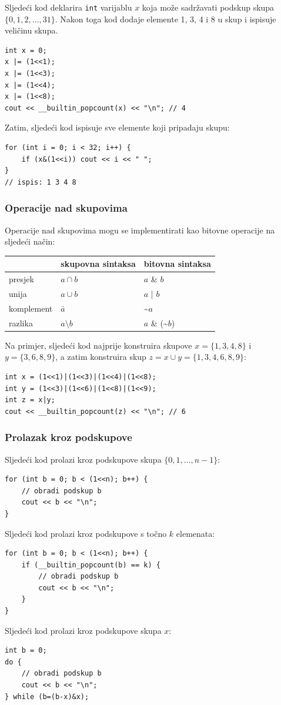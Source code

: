 Sljedeći kod deklarira \texttt{int}
varijablu $x$ koja može sadržavati
podskup skupa $\{0,1,2,\ldots,31\}$.
Nakon toga kod dodaje elemente 1, 3, 4 i 8
u skup i ispisuje veličinu skupa.
\begin{lstlisting}
int x = 0;
x |= (1<<1);
x |= (1<<3);
x |= (1<<4);
x |= (1<<8);
cout << __builtin_popcount(x) << "\n"; // 4
\end{lstlisting}
Zatim, sljedeći kod ispisuje sve
elemente koji pripadaju skupu:
\begin{lstlisting}
for (int i = 0; i < 32; i++) {
    if (x&(1<<i)) cout << i << " ";
}
// ispis: 1 3 4 8
\end{lstlisting}

\subsubsection{Operacije nad skupovima}

Operacije nad skupovima mogu se implementirati kao bitovne operacije na sljedeći način:

\begin{center}
\begin{tabular}{lll}
& skupovna sintaksa & bitovna sintaksa \\
\hline
presjek & $a \cap b$ & $a$ \& $b$ \\
unija & $a \cup b$ & $a$ | $b$ \\
komplement & $\bar a$ & \textasciitilde$a$ \\
razlika & $a \setminus b$ & $a$ \& (\textasciitilde$b$) \\
\end{tabular}
\end{center}

Na primjer, sljedeći kod najprije konstruira
skupove $x=\{1,3,4,8\}$ i $y=\{3,6,8,9\}$,
a zatim konstruira skup $z = x \cup y = \{1,3,4,6,8,9\}$:

\begin{lstlisting}
int x = (1<<1)|(1<<3)|(1<<4)|(1<<8);
int y = (1<<3)|(1<<6)|(1<<8)|(1<<9);
int z = x|y;
cout << __builtin_popcount(z) << "\n"; // 6
\end{lstlisting}

\subsubsection{Prolazak kroz podskupove}

Sljedeći kod prolazi kroz
podskupove skupa $\{0,1,\ldots,n-1\}$:

\begin{lstlisting}
for (int b = 0; b < (1<<n); b++) {
    // obradi podskup b
    cout << b << "\n";
}
\end{lstlisting}
Sljedeći kod prolazi kroz
podskupove s točno $k$ elemenata:
\begin{lstlisting}
for (int b = 0; b < (1<<n); b++) {
    if (__builtin_popcount(b) == k) {
        // obradi podskup b
        cout << b << "\n";
    }
}
\end{lstlisting}
Sljedeći kod prolazi kroz podskupove
skupa $x$:
\begin{lstlisting}
int b = 0;
do {
    // obradi podskup b
    cout << b << "\n";
} while (b=(b-x)&x);
\end{lstlisting}

